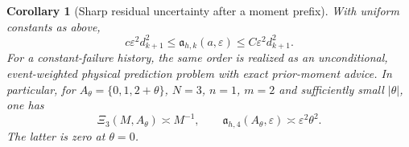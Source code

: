 \documentclass[11pt]{amsart}
\newtheorem{corollary}[theorem]{Corollary}
\theoremstyle{definition}\newtheorem{definition}[theorem]{Definition}
\theoremstyle{remark}\newtheorem{remark}[theorem]{Remark}
\begin{document}
\begin{corollary}[Sharp residual uncertainty after a moment prefix]
\label{cor:prefix-ambiguity}
With uniform constants as above,
\begin{equation}\label{eq:prefix-ambiguity-risk}
 c\varepsilon^2d_{k+1}^2
 \le\mathfrak a_{h,k}(a,\varepsilon)
 \le C\varepsilon^2d_{k+1}^2.
\end{equation}
For a constant-failure history, the same order is realized as an
unconditional, event-weighted physical prediction problem with exact
prior-moment advice. In particular, for
$A_\theta=\{0,1,2+\theta\}$, $N=3$, $n=1$, $m=2$ and sufficiently
small $|\theta|$, one has
\begin{equation}\label{eq:invisible-memory-visible-ambiguity}
 \Xi_3(M,A_\theta)\asymp M^{-1},\qquad
 \mathfrak a_{h,4}(A_\theta,\varepsilon)
                            \asymp\varepsilon^2\theta^2.
\end{equation}
The latter is zero at $\theta=0$.
\end{corollary}
\end{document}
